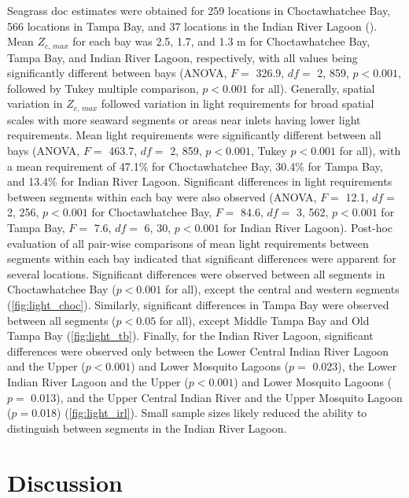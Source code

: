 \documentclass[letterpaper,12pt,oneside]{article}\usepackage[]{graphicx}\usepackage[]{color}
\begin{document}
Seagrass \ac{doc} estimates were obtained for 259 locations in Choctawhatchee Bay, 566 locations in Tampa Bay, and 37 locations in the Indian River Lagoon ().  Mean $Z_{c,\,max}$ for each bay was 2.5, 1.7, and 1.3 m for Choctawhatchee Bay, Tampa Bay, and Indian River Lagoon, respectively, with all values being significantly different between bays (ANOVA, $F=$ 326.9, $df =$ 2, 859, $p < 0.001$, followed by Tukey multiple comparison, $p<0.001$ for all).  Generally, spatial variation in $Z_{c,\,max}$ followed variation in light requirements for broad spatial scales with more seaward segments or areas near inlets having lower light requirements.  Mean light requirements were significantly different between all bays (ANOVA, $F=$ 463.7, $df =$ 2, 859, $p < 0.001$, Tukey $p<0.001$ for all), with a mean requirement of 47.1\% for Choctawhatchee Bay, 30.4\% for Tampa Bay, and 13.4\% for Indian River Lagoon.  Significant differences in light requirements between segments within each bay were also observed (ANOVA, $F =$ 12.1, $df =$ 2, 256, $p < 0.001$ for Choctawhatchee Bay, $F =$ 84.6, $df =$ 3, 562, $p < 0.001$ for Tampa Bay, $F =$ 7.6, $df =$ 6, 30, $p < 0.001$ for Indian River Lagoon).  Post-hoc evaluation of all pair-wise comparisons of mean light requirements between segments within each bay indicated that significant differences were apparent for several locations.  Significant differences were observed between all segments in Choctawhatchee Bay ($p<0.001$ for all), except the central and western segments (\cref{fig:light_choc}).  Similarly, significant differences in Tampa Bay were observed between all segments ($p<0.05$ for all), except Middle Tampa Bay and Old Tampa Bay (\cref{fig:light_tb}).  Finally, for the Indian River Lagoon, significant differences were observed only between the Lower Central Indian River Lagoon and the Upper ($p<0.001$) and Lower Mosquito Lagoons ($p = $ 0.023),  the Lower Indian River Lagoon and the Upper ($p<0.001$) and Lower Mosquito Lagoons ($p =$ 0.013), and the Upper Central Indian River and the Upper Mosquito Lagoon ($p = $0.018) (\cref{fig:light_irl}).  Small sample sizes likely reduced the ability to distinguish between segments in the Indian River Lagoon.

\section{Discussion}
\end{document}
